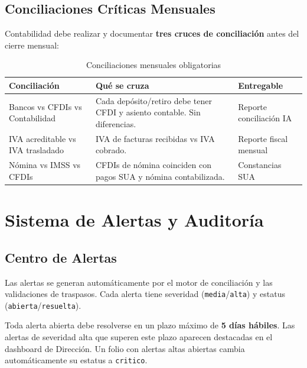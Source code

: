 \documentclass[12pt,a4paper]{article}
\begin{document}
\subsection{Conciliaciones Cr\'iticas Mensuales}

Contabilidad debe realizar y documentar \textbf{tres cruces de conciliaci\'on} antes
del cierre mensual:

\begin{table}[h!]
\centering
\begin{tabularx}{\textwidth}{lXl}
\toprule
\textbf{Conciliaci\'on} & \textbf{Qu\'e se cruza} & \textbf{Entregable} \\
\midrule
Bancos vs CFDIs vs Contabilidad &
  Cada dep\'osito/retiro debe tener CFDI y asiento contable. Sin diferencias. &
  Reporte conciliaci\'on IA \\[6pt]
IVA acreditable vs IVA trasladado &
  IVA de facturas recibidas vs IVA cobrado. &
  Reporte fiscal mensual \\[6pt]
N\'omina vs IMSS vs CFDIs &
  CFDIs de n\'omina coinciden con pagos SUA y n\'omina contabilizada. &
  Constancias SUA \\
\bottomrule
\end{tabularx}
\caption{Conciliaciones mensuales obligatorias}
\end{table}

\newpage

\section{Sistema de Alertas y Auditor\'ia}

\subsection{Centro de Alertas}

Las alertas se generan autom\'aticamente por el motor de conciliaci\'on y las
validaciones de traspasos. Cada alerta tiene severidad (\texttt{media}/\texttt{alta})
y estatus (\texttt{abierta}/\texttt{resuelta}).

\begin{rulebox}
Toda alerta abierta debe resolverse en un plazo m\'aximo de \textbf{5 d\'ias h\'abiles}.
Las alertas de severidad alta que superen este plazo aparecen destacadas en el
dashboard de Direcci\'on. Un folio con alertas altas abiertas cambia autom\'aticamente
su estatus a \texttt{critico}.
\end{rulebox}
\end{document}
